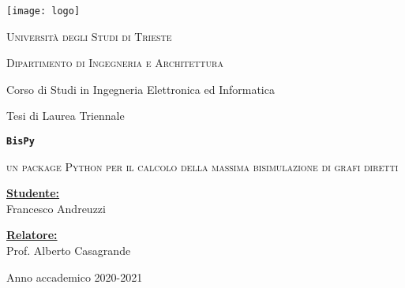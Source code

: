 \documentclass[11pt]{article}
\begin{document}
\begin{titlepage}
  \begin{center}
      \texttt{[image: logo]}

      \vspace{1cm}

      \Large
      \textsc{Università degli Studi di Trieste}
      \makebox[\textwidth][c]{\rule{\textwidth}{.4pt}}

      \textsc{Dipartimento di Ingegneria e Architettura}

      \vspace{0.5cm}
      Corso di Studi in Ingegneria Elettronica ed Informatica

      \vspace{1cm}

      Tesi di Laurea Triennale

      \vspace{1cm}

      \makebox[\textwidth][c]{\rule{\textwidth}{.4pt}}
      \Large
      \textbf{\texttt{BisPy}}

      \large
      \textsc{un package Python per il calcolo della massima bisimulazione di grafi diretti}
      \makebox[\textwidth][c]{\rule{\textwidth}{.4pt}}
      \vspace{1.5cm}

      \begin{minipage}{2in}
        \textbf{\underline{Studente:}} \\
        Francesco Andreuzzi
      \end{minipage}
      \hfill
      \begin{minipage}{2in}
        \textbf{\underline{Relatore:}} \\
        Prof. Alberto Casagrande
      \end{minipage}

      \vspace*{\fill}

      \makebox[\textwidth][c]{\rule{\textwidth}{.4pt}}

      Anno accademico 2020-2021
  \end{center}
\end{titlepage}

\renewcommand\contentsname{Indice}
\tableofcontents
{}


\clearpage

\clearpage

\clearpage

\clearpage

\clearpage

\renewcommand\refname{Bibliografia}


\end{document}
